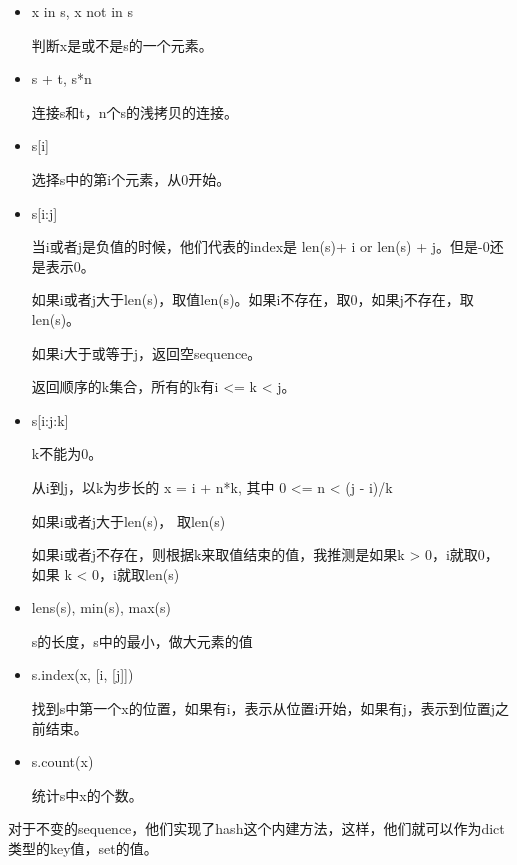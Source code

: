 \begin{itemize}
\item x in s, x not in s

判断x是或不是s的一个元素。

\item s + t, s*n

连接s和t，n个s的浅拷贝的连接。

\item s[i]

选择s中的第i个元素，从0开始。

\item s[i:j]

当i或者j是负值的时候，他们代表的index是 len(s)+ i or len(s) + j。但是-0还是表示0。


如果i或者j大于len(s)，取值len(s)。如果i不存在，取0，如果j不存在，取len(s)。

如果i大于或等于j，返回空sequence。

返回顺序的k集合，所有的k有i <= k < j。

\item s[i:j:k] 

k不能为0。

从i到j，以k为步长的 x = i + n*k, 其中 0 <= n < (j - i)/k

如果i或者j大于len(s)， 取len(s)

如果i或者j不存在，则根据k来取值结束的值，我推测是如果k > 0，i就取0，如果 k < 0，i就取len(s)

\item lens(s), min(s), max(s)

s的长度，s中的最小，做大元素的值

\item s.index(x, [i, [j]])

找到s中第一个x的位置，如果有i，表示从位置i开始，如果有j，表示到位置j之前结束。

\item s.count(x)

统计s中x的个数。

\end{itemize}

对于不变的sequence，他们实现了hash这个内建方法，这样，他们就可以作为dict类型的key值，set的值。

